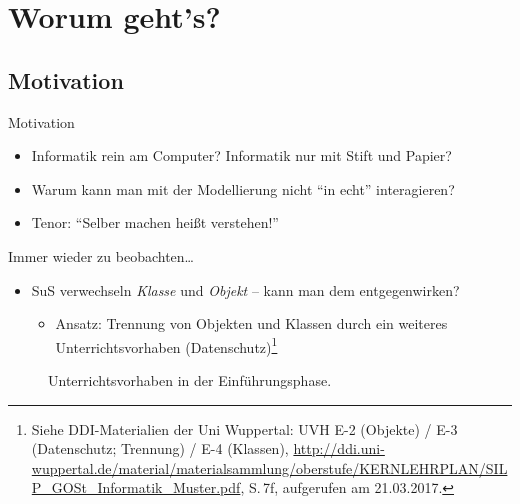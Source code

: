 \documentclass[usenames,dvipsnames]{beamer}
\begin{document}
\section{Worum geht's?}


\subsection{Motivation}


\begin{frame}{Motivation}
	\begin{itemize}
		\item Informatik rein am Computer? Informatik nur mit Stift und Papier?
		\item Warum kann man mit der Modellierung nicht \enquote{in echt} interagieren?
		\item Tenor: \enquote{Selber machen heißt verstehen!}
	\end{itemize}
\end{frame}


\begin{frame}{Immer wieder zu beobachten\ldots}
	\begin{itemize}
		\item SuS verwechseln \emph{Klasse} und \emph{Objekt} -- kann man dem entgegenwirken?
		\begin{itemize}
			\item Ansatz: Trennung von Objekten und Klassen durch ein weiteres Unterrichtsvorhaben (Datenschutz)\footnote{\tiny{Siehe DDI-Materialien der Uni Wuppertal: UVH E-2 (Objekte) / E-3 (Datenschutz; Trennung) / E-4 (Klassen), \url{http://ddi.uni-wuppertal.de/material/materialsammlung/oberstufe/KERNLEHRPLAN/SILP_GOSt_Informatik_Muster.pdf}, S.\,7f, aufgerufen am 21.03.2017.}}
		\end{itemize}
	\end{itemize}

	\begin{figure}[tbp]
		\centering
		\caption{Unterrichtsvorhaben in der Einführungsphase.}
	\end{figure}
\end{frame}

\end{document}
